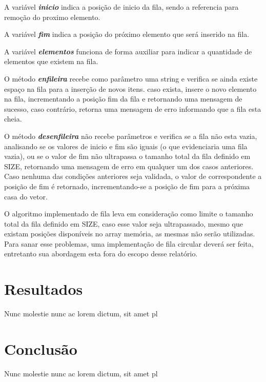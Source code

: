 \documentclass[rascunho,xindy,sublist]{fei}
\begin{document}
A variável \textbf{\textit{inicio}} indica a posição de inicio da fila, sendo a referencia para remoção do proximo elemento.

A variável \textbf{\textit{fim}} indica a posição do próximo elemento que será inserido na fila.

A variável \textbf{\textit{elementos}} funciona de forma auxiliar para indicar a quantidade de elementos que existem na fila.

O método \textbf{\textit{enfileira}} recebe como parâmetro uma string e verifica se ainda existe espaço na fila para a inserção de novos itens. caso exista, insere o novo elemento na fila, incrementando a posição fim da fila e retornando uma mensagem de sucesso, caso contrário, retorna uma mensagem de erro informando que a fila esta cheia.

O método \textbf{\textit{desenfileira}} não recebe parâmetros e verifica se a fila não esta vazia, analisando se os valores de inicio e fim são iguais (o que evidenciaria uma fila vazia), ou se o valor de fim não ultrapassa o tamanho total da fila definido em SIZE, retornando uma mensagem de erro em qualquer um dos casos anteriores. Caso nenhuma das condições anteriores seja validada, o valor de correspondente a posição de fim é retornado, incrementando-se a posição de fim para a próxima casa do vetor.

O algoritmo implementado de fila leva em consideração como limite o tamanho total da fila definido em SIZE, caso esse valor seja ultrapassado, mesmo que existam posições disponíveis no array memória, as mesmas não serão utilizadas. Para sanar esse problemas, uma implementação de fila circular deverá ser feita, entretanto sua abordagem esta fora do escopo desse relatório.

\chapter{Resultados}

Nunc molestie nunc ac lorem dictum, sit amet pl

\chapter{Conclusão}

Nunc molestie nunc ac lorem dictum, sit amet pl

\printbibliography

\printindex
\end{document}
